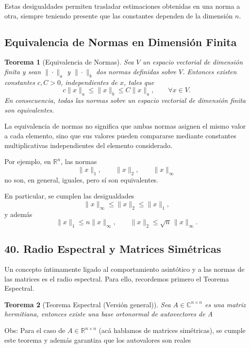 \documentclass[12pt]{article}
\newtheorem{teorema}{Teorema}
\begin{document}
Estas desigualdades permiten trasladar estimaciones obtenidas en una
norma a otra, siempre teniendo presente que las constantes dependen
de la dimensión $n$.

\subsection*{Equivalencia de Normas en Dimensión Finita}

\begin{teorema}[Equivalencia de Normas]
Sea $V$ un espacio vectorial de dimensión finita y sean 
$\|\cdot\|_a$ y $\|\cdot\|_b$ dos normas definidas sobre $V$.
Entonces existen constantes $c,C>0$, independientes de $x$, tales que
\[
c\|x\|_a
\leq
\|x\|_b
\leq
C\|x\|_a,
\qquad \forall x\in V.
\]
En consecuencia, todas las normas sobre un espacio vectorial de dimensión finita son equivalentes.
\end{teorema}

La equivalencia de normas no significa que ambas normas asignen el mismo valor a cada elemento, sino que sus valores pueden compararse mediante constantes multiplicativas independientes del elemento considerado.

Por ejemplo, en $\mathbb{R}^n$, las normas
\[
\|x\|_1,
\qquad
\|x\|_2,
\qquad
\|x\|_\infty
\]
no son, en general, iguales, pero sí son equivalentes.

En particular, se cumplen las desigualdades
\[
\|x\|_\infty
\leq
\|x\|_2
\leq
\|x\|_1,
\]
y además
\[
\|x\|_1
\leq
n\|x\|_\infty,
\qquad
\|x\|_2
\leq
\sqrt{n}\,\|x\|_\infty.
\]

\subsection*{40. Radio Espectral y Matrices Simétricas}

Un concepto íntimamente ligado al comportamiento asintótico y a las normas de las matrices es el radio espectral. Para ello, recordemos primero el Teorema Espectral.

\begin{teorema}[Teorema Espectral (Versión general)]
Sea $A \in \mathbb{C}^{n \times n}$ es una matriz hermitiana, entonces existe una base ortonormal de autovectores de A
\end{teorema}

Obs: Para el caso de $A \in \mathbb{R}^{n \times n}$ (acá hablamos de matrices simétricas), se cumple este teorema y además garantiza que los autovalores son reales          
\end{document}
